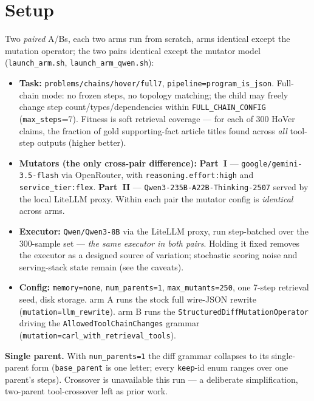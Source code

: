 \documentclass[11pt]{article}
\newcommand{\armA}{\textcolor{bad}{arm A}}
\newcommand{\armB}{\textcolor{accent}{arm B}}
\begin{document}
\section{Setup}
\label{sec:setup}
Two \emph{paired} A/Bs, each two arms run from scratch, arms identical except the mutation
operator; the two pairs identical except the mutator model (\texttt{launch\_arm.sh},
\texttt{launch\_arm\_qwen.sh}):
\begin{itemize}
  \item \textbf{Task:} \texttt{problems/chains/hover/full7}, \texttt{pipeline=program\_is\_json}.
  Full-chain mode: no frozen steps, no topology matching; the child may freely change step
  count/types/dependencies within \texttt{FULL\_CHAIN\_CONFIG} (\texttt{max\_steps}=7). Fitness
  is soft retrieval coverage --- for each of 300 HoVer claims, the fraction of gold
  supporting-fact article titles found across \emph{all} tool-step outputs (higher better).
  \item \textbf{Mutators (the only cross-pair difference):}
  \textbf{Part~I} --- \texttt{google/gemini-3.5-flash} via OpenRouter, with
  \texttt{reasoning.effort:high} and \texttt{service\_tier:flex}.
  \textbf{Part~II} --- \texttt{Qwen3-235B-A22B-Thinking-2507} served by the local LiteLLM
  proxy. Within each pair the mutator config is \emph{identical} across arms.
  \item \textbf{Executor:} \texttt{Qwen/Qwen3-8B} via the LiteLLM proxy, run step-batched over the
  300-sample set --- \emph{the same executor in both pairs}. Holding it fixed removes the executor
  as a designed source of variation; stochastic scoring noise and serving-stack state remain
  (see the caveats).
  \item \textbf{Config:} \texttt{memory=none}, \texttt{num\_parents=1},
  \texttt{max\_mutants=250}, one 7-step retrieval seed, disk storage. \armA{} runs the stock
  full wire-JSON rewrite
  (\texttt{mutation=llm\_rewrite}). \armB{} runs the \texttt{StructuredDiffMutationOperator}
  driving the \texttt{AllowedToolChainChanges} grammar
  (\texttt{mutation=carl\_with\_retrieval\_tools}).
\end{itemize}

\noindent\textbf{Single parent.} With \texttt{num\_parents=1} the diff grammar collapses to its
single-parent form (\texttt{base\_parent} is one letter; every \texttt{keep}-id enum ranges
over one parent's steps). Crossover is unavailable this run --- a deliberate simplification,
two-parent tool-crossover left as prior work.
\end{document}
